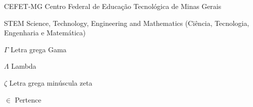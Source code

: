 \begin{siglas}
  \item[CEFET-MG] Centro Federal de Educação Tecnológica de Minas Gerais
  \item[STEM] Science, Technology, Engineering and Mathematics (Ciência, Tecnologia, Engenharia e Matemática)
\end{siglas}

\begin{simbolos}
  \item[$ \Gamma $] Letra grega Gama
  \item[$ \Lambda $] Lambda
  \item[$ \zeta $] Letra grega minúscula zeta
  \item[$ \in $] Pertence
\end{simbolos}

\tableofcontents*
\cleardoublepage
